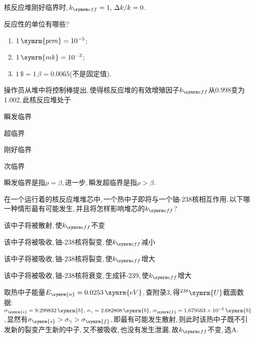\begin{exercise}
    核反应堆刚好临界时,\,$\keff = 1,\,\Delta k/k = 0$.
\end{exercise}

\begin{exercise}
    反应性的单位有哪些?
    \begin{solution}
        \begin{enumerate}[(1)]
            \item $1\,\symrm{pcm} = 10^{-5}$;
            \item $1\,\symrm{mk} = 10^{-3}$;
            \item $1\,\$ = 1\,\beta = 0.0065$(不是固定值).
        \end{enumerate}
    \end{solution}
\end{exercise}

\begin{exercise}
    操作员从堆中将控制棒提出,\,使得核反应堆的有效增殖因子$\keff$从0.998变为1.002,\,此核反应堆处于\xparen
    \begin{xchoices}[showanswer=true]
        \item 瞬发临界
        \item* 超临界
        \item 刚好临界
        \item 次临界
    \end{xchoices}
    \vspace{1em}
    \noindent {\color{third}{【注】}} {\kaishu 瞬发临界是指$\rho = \beta$,\,进一步,\,瞬发超临界是指$\rho > \beta$.}
\end{exercise}

\begin{exercise}
    在一个运行着的核反应堆堆芯中,\,一个热中子即将与一个铀-238核相互作用.\,以下哪一种情形最有可能发生,\,并且将怎样影响堆芯的$\keff$?\xparen
    \begin{xchoices}[showanswer=true]
        \item* 该中子将被散射,\,使$\keff$不变
        \item 该中子将被吸收,\,铀-238核将裂变,\,使$\keff$减小
        \item 该中子将被吸收,\,铀-238核将裂变,\,使$\keff$增大
        \item 该中子将被吸收,\,铀-238核将衰变,\,生成钚-239,\,使$\keff$增大
    \end{xchoices}
    \vspace{1em}
    \begin{solution}
        取热中子能量$E_{\symrm{n}}=0.0253\,\symrm{eV}$,\,查附录3,\,得${}^{238}\symrm{U}$截面数据:\,$\sigma_{\symrm{s}} = 9.299832\,\symrm{b},\,\sigma_{\gamma} = 2.682808\,\symrm{b},\,\sigma_{\symrm{f}} = 1.679563\times 10^{-5}\,\symrm{b}$,\,显然有$\sigma_{\symrm{s}} > \sigma_{\gamma} > \sigma_{\symrm{f}}$,\,即最有可能发生散射,\,则此时该热中子既不引发新的裂变产生新的中子,\,又不被吸收,\,也没有发生泄漏,\,故$\keff$不变,\,选A.\,
    \end{solution}
\end{exercise}

